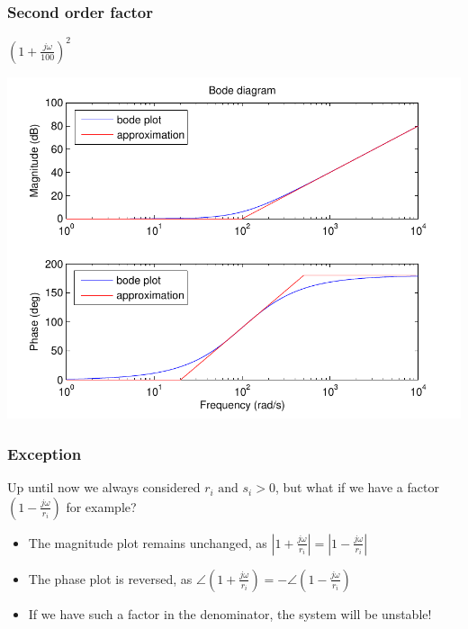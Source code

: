 \begin{frame}
\frametitle{Second order factor}
$(1+\frac{j\omega}{100})^2$

\begin{center}
\includegraphics[scale=0.5]{BodeSecondOrder}
\end{center}


\end{frame}


\begin{frame}
\frametitle{Exception}
Up until now we always considered $r_i \text{ and } s_i > 0$, but what if we have a factor $(1-\frac{j\omega}{r_i})$ for example?
\begin{itemize}
\item The magnitude plot remains unchanged, as $|1+\frac{j\omega}{r_i}| = |1 - \frac{j\omega}{r_i} |$
\item The phase plot is reversed, as $\angle(1+\frac{j\omega}{r_i}) = -\angle(1 - \frac{j\omega}{r_i})$
\item If we have such a factor in the denominator, the system will be unstable!
\end{itemize}

\end{frame}


